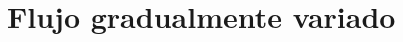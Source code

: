 \documentclass[11pt, oneside]{article}
\begin{document}

\section{Flujo gradualmente variado} %
\end{document}
